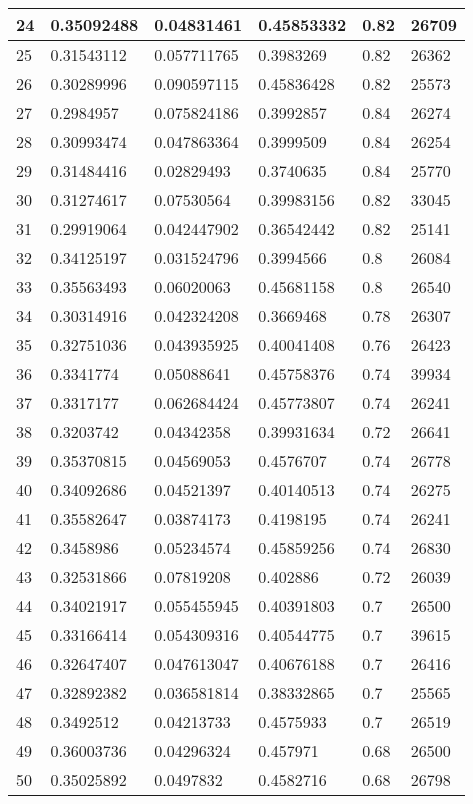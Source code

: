 \begin{longtable}{|l|l|l|l|l|l|}
24 & 0.35092488 & 0.04831461 & 0.45853332 & 0.82 & 26709 \\ \hline 
25 & 0.31543112 & 0.057711765 & 0.3983269 & 0.82 & 26362 \\ \hline 
26 & 0.30289996 & 0.090597115 & 0.45836428 & 0.82 & 25573 \\ \hline 
27 & 0.2984957 & 0.075824186 & 0.3992857 & 0.84 & 26274 \\ \hline 
28 & 0.30993474 & 0.047863364 & 0.3999509 & 0.84 & 26254 \\ \hline 
29 & 0.31484416 & 0.02829493 & 0.3740635 & 0.84 & 25770 \\ \hline 
30 & 0.31274617 & 0.07530564 & 0.39983156 & 0.82 & 33045 \\ \hline 
31 & 0.29919064 & 0.042447902 & 0.36542442 & 0.82 & 25141 \\ \hline 
32 & 0.34125197 & 0.031524796 & 0.3994566 & 0.8 & 26084 \\ \hline 
33 & 0.35563493 & 0.06020063 & 0.45681158 & 0.8 & 26540 \\ \hline 
34 & 0.30314916 & 0.042324208 & 0.3669468 & 0.78 & 26307 \\ \hline 
35 & 0.32751036 & 0.043935925 & 0.40041408 & 0.76 & 26423 \\ \hline 
36 & 0.3341774 & 0.05088641 & 0.45758376 & 0.74 & 39934 \\ \hline 
37 & 0.3317177 & 0.062684424 & 0.45773807 & 0.74 & 26241 \\ \hline 
38 & 0.3203742 & 0.04342358 & 0.39931634 & 0.72 & 26641 \\ \hline 
39 & 0.35370815 & 0.04569053 & 0.4576707 & 0.74 & 26778 \\ \hline 
40 & 0.34092686 & 0.04521397 & 0.40140513 & 0.74 & 26275 \\ \hline 
41 & 0.35582647 & 0.03874173 & 0.4198195 & 0.74 & 26241 \\ \hline 
42 & 0.3458986 & 0.05234574 & 0.45859256 & 0.74 & 26830 \\ \hline 
43 & 0.32531866 & 0.07819208 & 0.402886 & 0.72 & 26039 \\ \hline 
44 & 0.34021917 & 0.055455945 & 0.40391803 & 0.7 & 26500 \\ \hline 
45 & 0.33166414 & 0.054309316 & 0.40544775 & 0.7 & 39615 \\ \hline 
46 & 0.32647407 & 0.047613047 & 0.40676188 & 0.7 & 26416 \\ \hline 
47 & 0.32892382 & 0.036581814 & 0.38332865 & 0.7 & 25565 \\ \hline 
48 & 0.3492512 & 0.04213733 & 0.4575933 & 0.7 & 26519 \\ \hline 
49 & 0.36003736 & 0.04296324 & 0.457971 & 0.68 & 26500 \\ \hline 
50 & 0.35025892 & 0.0497832 & 0.4582716 & 0.68 & 26798 \\ \hline 
\end{longtable}
